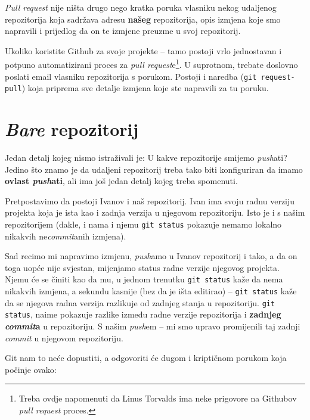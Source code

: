 \emph{Pull request} nije ništa drugo nego kratka poruka vlasniku nekog udaljenog repozitorija koja sadržava adresu \textbf{našeg} repozitorija, opis izmjena koje smo napravili i prijedlog da on te izmjene preuzme u svoj repozitorij.

Ukoliko koristite Github za svoje projekte -- tamo postoji vrlo jednostavan i potpuno automatizirani proces za \emph{pull request}e\footnote{Treba ovdje napomenuti da Linus Torvalds ima neke prigovore na Githubov \emph{pull request} proces.}.
U suprotnom, trebate doslovno poslati email vlasniku repozitorija s porukom.
Postoji i naredba (\verb+git request-pull+) koja priprema sve detalje izmjena koje ste napravili za tu poruku.

\section*{\emph{Bare} repozitorij}

Jedan detalj kojeg nismo istraživali je: U kakve repozitorije smijemo \emph{push}ati? 
Jedino što znamo je da udaljeni repozitorij treba tako biti konfiguriran da imamo \textbf{ovlast \emph{push}ati}, ali ima još jedan detalj kojeg treba spomenuti.

Pretpostavimo da postoji Ivanov i naš repozitorij.
Ivan ima svoju radnu verziju projekta koja je ista kao i zadnja verzija u njegovom repozitoriju.
Isto je i s našim repozitorijem (dakle, i nama i njemu \verb+git status+ pokazuje nemamo lokalno nikakvih ne\emph{commit}anih izmjena).

Sad recimo mi napravimo izmjenu, \emph{push}amo u Ivanov repozitorij i tako, a da on toga uopće nije svjestan, mijenjamo status radne verzije njegovog projekta.
Njemu će se činiti kao da mu, u jednom trenutku \verb+git status+ kaže da nema nikakvih izmjena, a sekundu kasnije (bez da je išta editirao) -- \verb+git status+ kaže da se njegova radna verzija razlikuje od zadnjeg stanja u repozitoriju.
\verb+git status+, naime pokazuje razlike između radne verzije repozitorija i \textbf{zadnjeg \emph{commit}a} u repozitoriju.
S našim \emph{push}em -- mi smo upravo promijenili taj zadnji \emph{commit} u njegovom repozitoriju.

Git nam to neće dopustiti, a odgovoriti će dugom i kriptičnom porukom koja počinje ovako:


